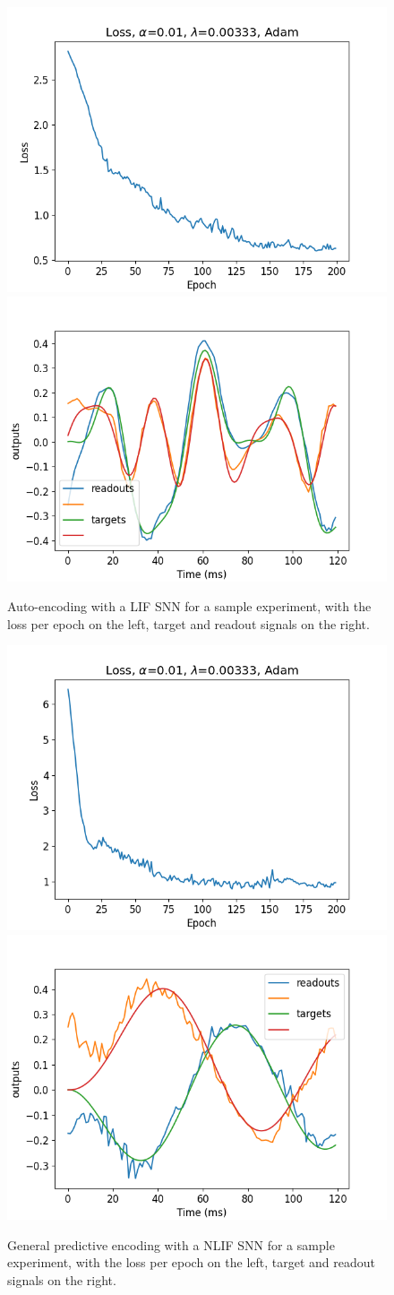 \documentclass[mphil,deptreport,ianc]{infthesis} %
\begin{document}
\begin{figure}
    \centering
    \includegraphics[width=0.49\columnwidth]{figures/Gating/AutoEncoding/LIF_sample/plot_loss_test_mt_LIF_et_AutoEncoding_N_30_titers_200.png}
    \includegraphics[width=0.49\columnwidth]{figures/Gating/AutoEncoding/LIF_sample/test_plot_outputs_LIF_seed_25.png}
    \caption{Auto-encoding with a LIF SNN for a sample experiment, with the loss per epoch on the left, target and readout signals on the right.}
    \label{fig:autoencoding_LIF}
\end{figure}


\begin{figure}
    \centering
    \includegraphics[width=0.49\columnwidth]{figures/Gating/GeneralPredictiveEncoding/NLIF_sample/plot_loss_test_mt_NLIF_et_GeneralPredictiveEncoding_N_30_titers_200.png}
    \includegraphics[width=0.49\columnwidth]{figures/Gating/GeneralPredictiveEncoding/NLIF_sample/test_plot_outputs_NLIF_seed_25.png}
    \caption{General predictive encoding with a NLIF SNN for a sample experiment, with the loss per epoch on the left, target and readout signals on the right.}
    \label{fig:general_predictive_NLIF}
\end{figure}
\end{document}
